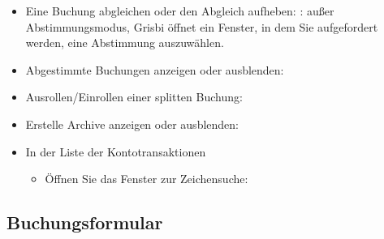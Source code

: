 \begin{itemize}
	\item Eine Buchung abgleichen oder den Abgleich aufheben: \newline
	\Note{}: außer Abstimmungsmodus, Grisbi öffnet ein Fenster, in dem Sie aufgefordert werden, eine Abstimmung auszuwählen.
	\item Abgestimmte Buchungen anzeigen oder ausblenden: 
	\item Ausrollen/Einrollen einer splitten Buchung: 
	\item Erstelle Archive anzeigen oder ausblenden: 
	\item In der Liste der Kontotransaktionen
	\begin{itemize}
		\item Öffnen Sie das Fenster zur Zeichensuche: 
	\end{itemize}
\end{itemize}

\subsection{Buchungsformular}

